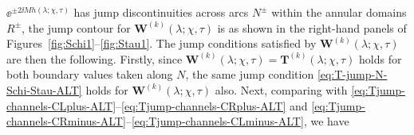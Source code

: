 $\ee^{\pm 2\ii Mh(\lambda;\chi,\tau)}$
has jump discontinuities across arcs $N^\pm$ within the annular domains $R^\pm$, 
the jump contour for $\mathbf{W}^{(k)}(\lambda;\chi,\tau)$ is as shown in the right-hand panels of Figures~\ref{fig:Schi1}--\ref{fig:Stau1}.
The jump conditions satisfied by $\mathbf{W}^{(k)}(\lambda;\chi,\tau)$ are then the following.  Firstly, since $\mathbf{W}^{(k)}(\lambda;\chi,\tau)=\mathbf{T}^{(k)}(\lambda;\chi,\tau)$ holds for both boundary values taken along $N$, the same jump condition \eqref{eq:T-jump-N-Schi-Stau-ALT} holds for $\mathbf{W}^{(k)}(\lambda;\chi,\tau)$ also.  Next, comparing with \eqref{eq:Tjump-channels-CLplus-ALT}--\eqref{eq:Tjump-channels-CRplus-ALT} and \eqref{eq:Tjump-channels-CRminus-ALT}--\eqref{eq:Tjump-channels-CLminus-ALT}, we have
